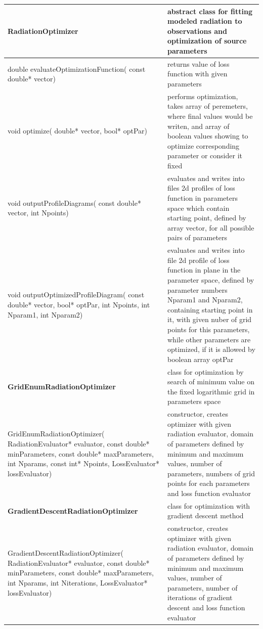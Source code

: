 \begin{small}
	\label{RadiationOptimizerMethods}
	\begin{xtabular}{|p{0.41\textwidth}|p{0.59\textwidth}|}
		\hline
		\textbf{RadiationOptimizer} & abstract class for fitting modeled radiation to observations and optimization of source parameters \\
		\hline
		double evaluateOptimizationFunction( const double* vector) & returns value of loss function with given parameters\\
		\hline
		void optimize( double* vector, bool* optPar) & performs optimization, takes array of peremeters, where final values would be writen, and array of boolean values showing to optimize corresponding parameter or consider it fixed \\
		\hline
		void outputProfileDiagrams( const double* vector, int Npoints) & evaluates and writes into files 2d profiles of loss function in parameters space which contain starting point, defined by array vector, for all possible pairs of parameters\\
		\hline
		void outputOptimizedProfileDiagram( const double* vector, bool* optPar, int Npoints, int Nparam1, int Nparam2) & evaluates and writes into file 2d profile of loss function in plane in the parameter space, defined by parameter numbers Nparam1 and Nparam2, containing starting point in it, with given nuber of grid points for this parameters, while other parameters are optimized, if it is allowed by boolean array optPar\\
		\hline
		\textbf{GridEnumRadiationOptimizer} & class for optimization by search of minimum value on the fixed logarithmic grid in parameters space\\
		\hline
		GridEnumRadiationOptimizer( RadiationEvaluator* evaluator, const double* minParameters, const double* maxParameters, int Nparams, const int* Npoints, LossEvaluator* lossEvaluator) & constructor, creates optimizer with given radiation evaluator, domain of parameters defined by minimum and maximum values, number of parameters, numbers of grid points for each parameters and loss function evaluator\\
		\hline
		\textbf{GradientDescentRadiationOptimizer} & class for optimization with gradient descent method\\
		\hline
		GradientDescentRadiationOptimizer( RadiationEvaluator* evaluator, const double* minParameters, const double* maxParameters, int Nparams, int Niterations, LossEvaluator* lossEvaluator) & constructor, creates optimizer with given radiation evaluator, domain of parameters defined by minimum and maximum values, number of parameters, number of iterations of gradient descent and loss function evaluator\\

\end{xtabular}
\end{small}
